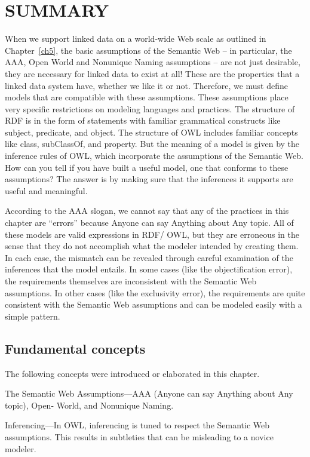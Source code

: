 \section{SUMMARY}

When we support linked data on a world-wide Web scale as outlined in Chapter~\ref{ch5}, 
the basic assumptions of the Semantic Web -- in particular, the AAA, Open World and Nonunique 
Naming assumptions -- are not just desirable, they are necessary for linked data to exist at all!  
These are the properties that a linked data system have, whether we like it or not.  
Therefore, we must define models that are compatible with these assumptions.    
These assumptions place very specific restrictions on 
modeling languages and practices. The structure of RDF is in the form of statements
with familiar grammatical constructs like subject, predicate, and
object. The structure of OWL includes familiar concepts like class,
subClassOf, and property. But the meaning of a model is given by the
inference rules of OWL, which incorporate the assumptions of the
Semantic Web. How can you tell if you have built a useful model, one
that conforms to these assumptions? The answer is by making sure that
the inferences it supports are useful and meaningful.

According to the AAA slogan, we cannot say that any of the practices in
this chapter are ``errors'' because Anyone can say Anything about Any
topic. All of these models are valid expressions in RDF/ OWL, but they
are erroneous in the sense that they do not accomplish what the modeler
intended by creating them. In each case, the mismatch can be revealed
through careful examination of the inferences that the model entails. In
some cases (like the objectification error), the requirements themselves
are inconsistent with the Semantic Web assumptions. In other cases (like
the exclusivity error), the requirements are quite consistent with the
Semantic Web assumptions and can be modeled easily with a simple
pattern.

\subsection{Fundamental concepts}

The following concepts were introduced or elaborated in this chapter.

The Semantic Web Assumptions---AAA (Anyone can say Anything about Any
topic), Open- World, and Nonunique Naming.

Inferencing---In OWL, inferencing is tuned to respect the Semantic Web
assumptions. This results in subtleties that can be misleading to a
novice modeler.

